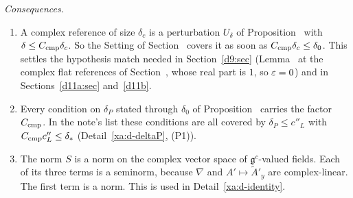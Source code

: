 \begin{detail}
\emph{Consequences.}
\begin{enumerate}[label=(\roman*)]
\item A complex reference of size $\delta_c$ is a perturbation $U_\delta$ of Proposition~ with $\delta\le C_{\rm cmp}\delta_c$. So the Setting of Section~ covers it as soon as $C_{\rm cmp}\delta_c\le\delta_0$. This settles the hypothesis match needed in Section~\ref{d9:sec} (Lemma~ at the complex flat references of Section~, whose real part is $1$, so $\varepsilon=0$) and in Sections~\ref{d11a:sec} and~\ref{d11b}.
\item Every condition on $\delta_P$ stated through $\delta_0$ of Proposition~ carries the factor $C_{\rm cmp}$. In the note's list these conditions are all covered by $\delta_P\le c''_L$ with $C_{\rm cmp}c''_L\le\delta_*$ (Detail~\ref{xa:d-deltaP}, (P1)).
\item The norm $S$ is a norm on the complex vector space of $\mathfrak g^c$-valued fields. Each of its three terms is a seminorm, because $\nabla$ and $A'\mapsto\tilde A'_y$ are complex-linear. The first term is a norm. This is used in Detail~\ref{xa:d-identity}.
\end{enumerate}
\end{detail}

